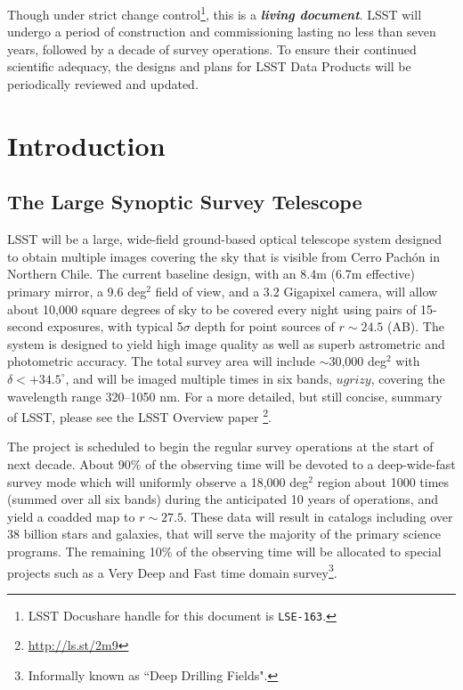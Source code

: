 \documentclass[12pt]{article}
\begin{document}
Though under strict change control\footnote{LSST Docushare handle for this document is {\tt LSE-163}.}, this is a {\bf \em living document}. LSST will undergo a period of construction  and commissioning lasting no less than seven years, followed by a decade of survey operations. To ensure their continued scientific adequacy, the designs and plans for LSST Data Products will be periodically reviewed and updated.

\clearpage

\section{Introduction}

\subsection{The Large Synoptic Survey Telescope}

LSST will be a large, wide-field ground-based optical telescope system
designed to obtain multiple images covering the sky that is visible from Cerro Pach\'{o}n in Northern Chile. The current baseline design, with an 8.4m (6.7m effective) primary mirror, a 9.6 deg$^2$ field of view, and a 3.2 Gigapixel camera, will allow about 10,000 square degrees of sky to be covered every night using pairs of 15-second exposures, with typical 5$\sigma$ depth for point sources of $r\sim24.5$ (AB). The system is designed to yield high image quality as well as superb astrometric  and photometric accuracy. The total survey area will include $\sim$30,000 deg$^2$ with $\delta<+34.5^\circ$, and will be imaged multiple times in six bands, $ugrizy$, covering the wavelength range 320--1050 nm. For a more detailed, but still concise,
summary of LSST, please see the LSST Overview paper \citep{2008arXiv0805.2366I}\footnote{\url{http://ls.st/2m9}}.

The project is scheduled to  begin the regular survey operations at the start of next decade. About 90\% of the observing time will be devoted to a deep-wide-fast survey mode which will uniformly observe a 18,000 deg$^2$ region about 1000 times (summed over all six bands) during the anticipated 10 years of operations, and yield a coadded map to $r\sim27.5$. These data will result in catalogs including over $38$ billion stars and galaxies, that will serve the majority of the primary science programs. The remaining 10\% of the observing time will be allocated to special projects such as a Very Deep and Fast time domain survey\footnote{Informally known as ``Deep Drilling Fields".}.
\end{document}
